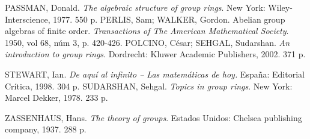 \begin{thebibliography}{99}
     PASSMAN, Donald. \textit{The algebraic structure of group rings}. New York: Wiley-Interscience, 1977. 550 p.
     PERLIS, Sam; WALKER, Gordon. Abelian group algebras of finite order. \textit{Transactions of The American Mathematical Society}. 1950, vol 68, núm 3, p. 420-426.
     POLCINO, César; SEHGAL, Sudarshan. \textit{An introduction to group rings}.  Dordrecht: Kluwer Academic Publishers, 2002. 371 p.
    
     STEWART, Ian. \textit{De aquí al infinito -- Las matemáticas de hoy.} España: Editorial Crítica, 1998. 304 p.
     SUDARSHAN, Sehgal.  \textit{Topics in group rings}. New York: Marcel Dekker, 1978. 233 p. 
    
    
    
	 ZASSENHAUS, Hans. \textit{The theory of groups}. Estados Unidos: Chelsea publishing company, 1937. 288 p. 
	
		
		
\end{thebibliography}
